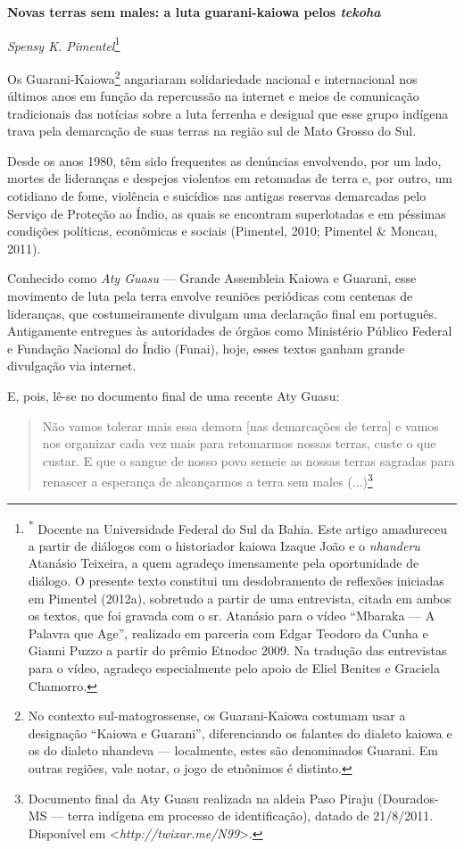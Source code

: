 \textbf{Novas terras sem males: a luta guarani-kaiowa pelos
\emph{tekoha}}

\emph{Spensy K. Pimentel}\footnote{\textsuperscript{*} Docente na
  Universidade Federal do Sul da Bahia. Este artigo amadureceu a partir
  de diálogos com o historiador kaiowa Izaque João e o \emph{nhanderu}
  Atanásio Teixeira, a quem agradeço imensamente pela oportunidade de
  diálogo. O presente texto constitui um desdobramento de reflexões
  iniciadas em Pimentel (2012a), sobretudo a partir de uma entrevista,
  citada em ambos os textos, que foi gravada com o sr. Atanásio para o
  vídeo ``Mbaraka --- A Palavra que Age'', realizado em parceria com
  Edgar Teodoro da Cunha e Gianni Puzzo a partir do prêmio Etnodoc 2009.
  Na tradução das entrevistas para o vídeo, agradeço especialmente pelo
  apoio de Eliel Benites e Graciela Chamorro.}

Os Guarani-Kaiowa\footnote{No contexto sul-matogrossense, os
  Guarani-Kaiowa costumam usar a designação ``Kaiowa e Guarani'',
  diferenciando os falantes do dialeto kaiowa e os do dialeto nhandeva
  --- localmente, estes são denominados Guarani. Em outras regiões, vale
  notar, o jogo de etnônimos é distinto.} angariaram solidariedade
nacional e internacional nos últimos anos em função da repercussão na
internet e meios de comunicação tradicionais das notícias sobre a luta
ferrenha e desigual que esse grupo indígena trava pela demarcação de
suas terras na região sul de Mato Grosso do Sul.

Desde os anos 1980, têm sido frequentes as denúncias envolvendo, por um
lado, mortes de lideranças e despejos violentos em retomadas de terra e,
por outro, um cotidiano de fome, violência e suicídios nas antigas
reservas demarcadas pelo Serviço de Proteção ao Índio, as quais se
encontram superlotadas e em péssimas condições políticas, econômicas e
sociais (Pimentel, 2010; Pimentel \& Moncau, 2011).

Conhecido como \emph{Aty Guasu} --- Grande Assembleia Kaiowa e Guarani,
esse movimento de luta pela terra envolve reuniões periódicas com
centenas de lideranças, que costumeiramente divulgam uma declaração
final em português. Antigamente entregues às autoridades de órgãos como
Ministério Público Federal e Fundação Nacional do Índio (Funai), hoje,
esses textos ganham grande divulgação via internet.

E, pois, lê-se no documento final de uma recente Aty Guasu:

\begin{quote}
Não vamos tolerar mais essa demora {[}nas demarcações de terra{]} e
vamos nos organizar cada vez mais para retomarmos nossas terras, custe o
que custar. E que o sangue de nosso povo semeie as nossas terras
sagradas para renascer a esperança de alcançarmos a terra sem males
(...)\footnote{Documento final da Aty Guasu realizada na aldeia Paso
  Piraju (Dourados-MS --- terra indígena em processo de identificação),
  datado de 21/8/2011. Disponível em
  \textless{}\emph{http://twixar.me/N99}\textgreater{}.}
\end{quote}

